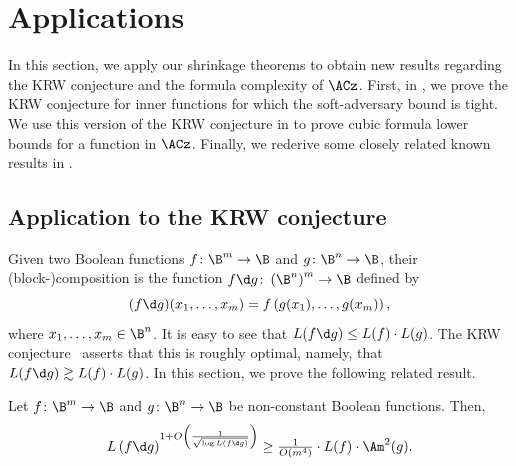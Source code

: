 \documentclass{toc}
\begin{document}
\section{\label{sec:applications}Applications}

In this section, we apply our shrinkage theorems to obtain new results
regarding the KRW conjecture and the formula complexity of $\ACz$.
First, in , we prove the KRW conjecture for inner
functions for which the soft-adversary bound is tight. We use this
version of the KRW conjecture in  to prove
cubic formula lower bounds for a function in $\ACz$. Finally, we
rederive some closely related known results in .

\subsection{\label{subsec:KRW}Application to the KRW conjecture}

Given two Boolean functions $f\colon\B^{m}\to\B$ and $g\colon\B^{n}\to\B$,
their (block-)\-composition is the function $f\d g\colon\left(\B^{n}\right)^{m}\to\B$
defined by 
\[
(f\d g)(x_{1},\ldots,x_{m})=f\left(g(x_{1}),\ldots,g(x_{m})\right),
\]
where $x_{1},\ldots,x_{m}\in\B^{n}$. It is easy to see that $L(f\d g)\le L(f)\cdot L(g)$.
The KRW conjecture~\cite{KRW95} asserts that this is roughly optimal,
namely, that $L(f\d g)\gtrsim L(f)\cdot L(g)$. In this section,
we prove the following related result. 
\begin{theorem}
\label{thm:composition-theorem}Let $f\colon\B^{m}\to\B$ and $g\colon\B^{n}\to\B$
be non-constant Boolean functions. Then, 
\[
L\left(f\d g\right)^{1+O\left(\frac{1}{\sqrt{\log L(f\d g)}}\right)}\geq\tfrac{1}{O(m^{4})}\cdot L(f)\cdot\Am^{2}(g).
\]
\end{theorem}
%
%
%
%
%
%
%
%
%
%
%
%
%
\end{document}
